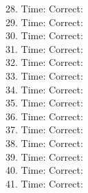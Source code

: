 \documentclass[12pt, letterpaper]{article}
\begin{document}
\begin{multicols}{2}
{28. Time: \underline{\hspace{6em}}\quad Correct: \underline{\hspace{3em}}\\
29. Time: \underline{\hspace{6em}}\quad Correct: \underline{\hspace{3em}}\\
30. Time: \underline{\hspace{6em}}\quad Correct: \underline{\hspace{3em}}\\
31. Time: \underline{\hspace{6em}}\quad Correct: \underline{\hspace{3em}}\\
32. Time: \underline{\hspace{6em}}\quad Correct: \underline{\hspace{3em}}\\
33. Time: \underline{\hspace{6em}}\quad Correct: \underline{\hspace{3em}}\\
34. Time: \underline{\hspace{6em}}\quad Correct: \underline{\hspace{3em}}\\
35. Time: \underline{\hspace{6em}}\quad Correct: \underline{\hspace{3em}}\\
36. Time: \underline{\hspace{6em}}\quad Correct: \underline{\hspace{3em}}\\
37. Time: \underline{\hspace{6em}}\quad Correct: \underline{\hspace{3em}}\\
38. Time: \underline{\hspace{6em}}\quad Correct: \underline{\hspace{3em}}\\
39. Time: \underline{\hspace{6em}}\quad Correct: \underline{\hspace{3em}}\\
40. Time: \underline{\hspace{6em}}\quad Correct: \underline{\hspace{3em}}\\
41. Time: \underline{\hspace{6em}}\quad Correct: \underline{\hspace{3em}}\\
}
\end{multicols}
\end{document}
